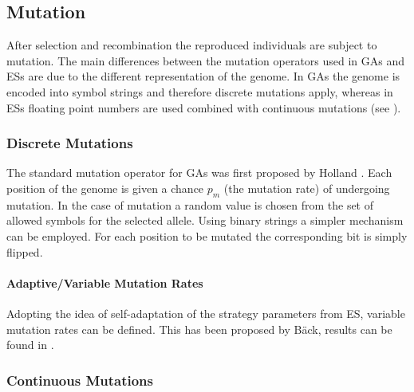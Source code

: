%
%

        \subsection{Mutation}

After selection and recombination the reproduced individuals are
subject to mutation.  The main differences between the mutation
operators used in GAs and ESs are due to the different representation
of the genome. In GAs the genome is encoded into symbol strings and
therefore discrete mutations apply, whereas in ESs floating point
numbers are used combined with continuous mutations (see
).


        \subsubsection{Discrete Mutations}

The standard mutation operator for GAs was first proposed by Holland
\cite{Holland:75}. Each position of the genome is given a chance $p_m$
(the mutation rate) of undergoing mutation.  In the case of mutation a
random value is chosen from the set of allowed symbols for the
selected allele.  Using binary strings a simpler mechanism can be
employed.  For each position to be mutated the corresponding bit is
simply flipped.


        \paragraph{Adaptive/Variable Mutation Rates}

Adopting the idea of self-adaptation of the strategy parameters from
ES, variable mutation rates can be defined.  This has been proposed by
B\"ack, results can be found in \cite{Baeck:91}.


        \subsubsection{Continuous Mutations}
        \label{mutation:subsubs:continuesMutations}

